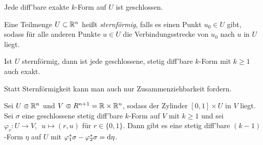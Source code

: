 \documentclass{cheat-sheet}
\begin{document}
\begin{beobachtung}
  Jede diff'bare exakte $k$-Form auf $U$ ist geschlossen.
\end{beobachtung}


\begin{defn}
  Eine Teilmenge $U \subset \mathbb{R}^n$ heißt \emph{sternförmig}, falls es einen Punkt $u_0 \in U$ gibt, sodass für alle anderen Punkte $u \in U$ die Verbindungsstrecke von $u_0$ nach $u$ in $U$ liegt.
\end{defn}

\begin{lem}[Poincaré]
  Ist $U$ sternförmig, dann ist jede geschlossene, stetig diff'bare $k$-Form mit $k \geq 1$ auch exakt.
\end{lem}

\begin{bem}
  Statt Sternförmigkeit kann man auch nur Zusammenziehbarkeit fordern.
\end{bem}


\begin{lem}
  Sei $U \opn \R^n$ und $V \opn R^{n{+}1} = \R \times \R^n$, sodass der Zylinder $[0,1] \times U$ in $V$ liegt. Sei $\sigma$ eine geschlossene stetig diff'bare $k$-Form auf $V$ mit $k \geq 1$ und sei $\varphi_r : U \to V, \enspace u \mapsto (r, u)$ für $r \in \{ 0, 1 \}$.
  Dann gibt es eine stetig diff'bare $(k{-}1)$-Form $\eta$ auf $U$ mit $\varphi_1^* \sigma - \varphi_2^* \sigma = \mathrm{d} \eta$.
\end{lem}




\end{document}
